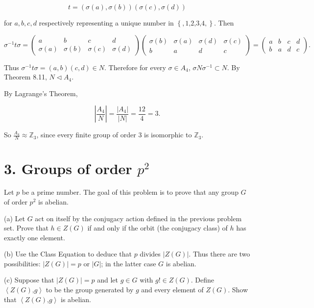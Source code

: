 \[t = \left( {\sigma(a),\sigma(b)} \right)\left( {\sigma(c),\sigma(d)} \right)\]

for \(a,b,c,d\) respectively representing a unique number in \(\left\{ {,1\text{,}2\text{,}3\text{,}4,} \right\}\). Then

\[\sigma^{- 1}t\sigma = \begin{pmatrix}
a & b & c & d \\
{\sigma(a)} & {\sigma(b)} & {\sigma(c)} & {\sigma(d)}
\end{pmatrix}\begin{pmatrix}
{\sigma(b)} & {\sigma(a)} & {\sigma(d)} & {\sigma(c)} \\
b & a & d & c
\end{pmatrix} = \begin{pmatrix}
a & b & c & d \\
b & a & d & c
\end{pmatrix}.\]

Thus \(\sigma^{- 1}t\sigma = \left( {a,b} \right)\left( {c,d} \right) \in N\). Therefore for every \(\sigma \in A_{4}\), \(\sigma N\sigma^{- 1} \subset N\). By Theorem 8.11, \(N \lhd A_{4}\).

By Lagrange's Theorem,

\[\left| \frac{A_{4}}{N} \right| = \frac{\left| A_{4} \right|}{|N|} = \frac{12}{4} = 3.\]

So \(\frac{A_{4}}{N} \approx \mathbb{Z}_{3}\), since every finite group of order \(3\) is isomorphic to \(\mathbb{Z}_{3}\).

\section{\texorpdfstring{3. Groups of order \(p^{2}\)}{3. Groups of order p\^{}\{2\}}}

Let \(p\) be a prime number. The goal of this problem is to prove that any group \(G\) of order \(p^{2}\) is abelian.

(a) Let \(G\) act on itself by the conjugacy action defined in the previous problem set. Prove that \(h \in Z(G)\) if and only if the orbit (the conjugacy class) of \(h\) has exactly one element.

(b) Use the Class Equation to deduce that \(p\) divides \(\left| {Z(G)} \right|\). Thus there are two possibilities: \(\left| {Z(G)} \right| = p\) or \(|G|\); in the latter case \(G\) is abelian.

(c) Suppose that \(\left| {Z(G)} \right| = p\) and let \(g \in G\) with \(g! \in Z(G)\). Define \(\left\langle {Z(G)\text{,}g} \right\rangle\) to be the group generated by \(g\) and every element of \(Z(G)\). Show that \(\left\langle {Z(G)\text{,}g} \right\rangle\) is abelian.

